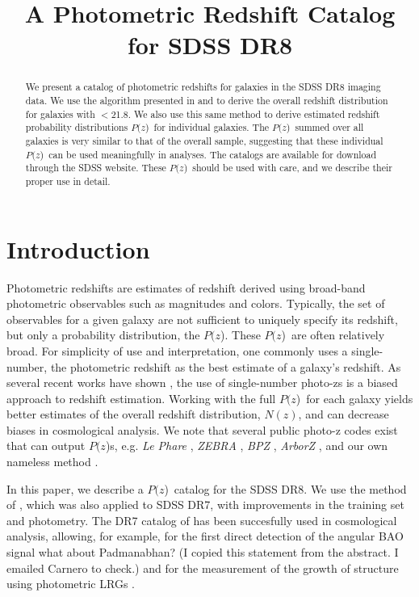 \documentclass[preprint]{aastex}
\newcommand{\rmax}{21.8}
\newcommand{\pofz}{$P(z$)}
\begin{document}
\title{A Photometric Redshift Catalog for SDSS DR8}



\begin{abstract}

We present a catalog of photometric redshifts for galaxies in the SDSS DR8
imaging data.  We use the algorithm presented in \citet{LimaPhotoz08} and
\citet{CunhaPhotoz09} to derive the overall redshift distribution for galaxies
with \rmag$ < $\rmax.  We also use this same method to derive estimated
redshift probability distributions \pofz\ for individual galaxies.  The \pofz\
summed over all galaxies is very similar to that of the overall sample,
suggesting that these individual \pofz\ can be used meaningfully in analyses.
The catalogs are available for download through the SDSS website.  These \pofz\
should be used with care, and we describe their proper use in detail.

\end{abstract}

\section{Introduction} \label{sec:intro}

Photometric redshifts are estimates of redshift derived using broad-band
photometric observables such as magnitudes and colors.  Typically, the set of
observables for a given galaxy are not sufficient to uniquely specify its
redshift, but only a probability distribution, the \pofz.  These \pofz\ are
often relatively broad. For simplicity of use and interpretation, one commonly
uses a single-number, the photometric redshift as the best estimate of a
galaxy's redshift.  As several recent works have shown
\citep{man08,CunhaPhotoz09,wit09,bor10,abr11}, the use of single-number
photo-zs is a biased approach to redshift estimation.  Working with the full
\pofz\ for each galaxy yields better estimates of the overall redshift
distribution, $N(z)$, and can decrease biases in cosmological analysis.  We
note that several public photo-z codes exist that can output \pofz s, e.g.
{\it Le Phare} \citep{arn99,ilb06}, {\it ZEBRA} \citep{fel06}, {\it BPZ} \citep{coe06}, {\it
ArborZ} \citep{ger10}, and our own nameless method \citep{CunhaPhotoz09}.


In this paper, we describe a \pofz\ catalog for the SDSS DR8.  We use the
method of \citet{CunhaPhotoz09}, which was also applied to SDSS DR7, with
improvements in the training set and  photometry.  The DR7 catalog of
\cite{CunhaPhotoz09} has been succesfully used in cosmological analysis,
allowing, for example, for the first direct detection of the angular BAO signal
\citep{car11} {\color{red} what about Padmanabhan?} {\color{blue} (I copied this statement from the abstract. I emailed Carnero to check.)} and for the measurement of
the growth of structure using photometric LRGs \citep{cro11}. 

\end{document}
